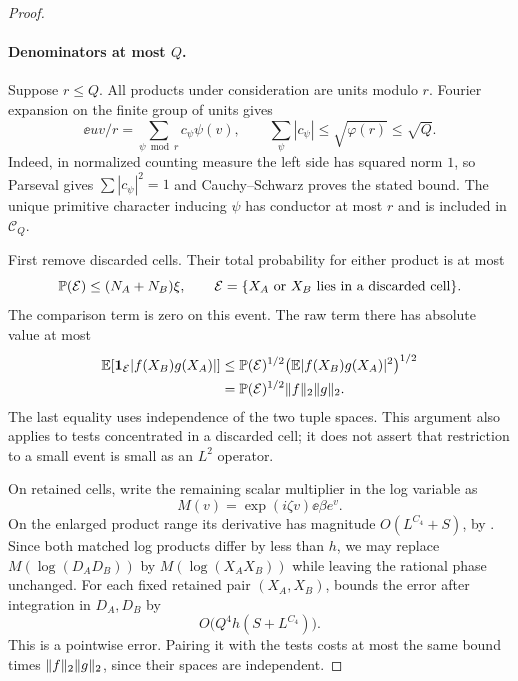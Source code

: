 \begin{proof}
\paragraph{Denominators at most $Q$.}
Suppose $r\leq Q$.  All products under consideration are units
modulo $r$.  Fourier expansion on the finite group of units gives
\begin{equation}\label{eq:ideal-rational-expansion}
 \ee{uv/r}=\sum_{\psi\bmod r}c_\psi\psi(v),\qquad
 \sum_\psi|c_\psi|\leq\sqrt{\varphi(r)}\leq\sqrt Q.
\end{equation}
Indeed, in normalized counting measure the left side has
squared norm $1$, so Parseval gives $\sum|c_\psi|^2=1$ and
Cauchy--Schwarz proves the stated bound.  The unique primitive
character inducing $\psi$ has conductor at most $r$ and is
included in $\mathcal C_Q$.

First remove discarded cells.  Their total probability for
either product is at most
\begin{equation}\label{eq:ideal-discarded-mass}
 \mathbb P(\mathcal E)\leq(N_A+N_B)\xi,
 \qquad
 \mathcal E=\{X_A\text{ or }X_B\text{ lies in a discarded cell}\}.
\end{equation}
The comparison term is zero on this event.  The raw term there
has absolute value at most
\begin{align*}
 \mathbb E[\mathbf 1_{\mathcal E}|f(X_B)g(X_A)|]
 &\leq\mathbb P(\mathcal E)^{1/2}
       \bigl(\mathbb E|f(X_B)g(X_A)|^2\bigr)^{1/2}\\
 &=\mathbb P(\mathcal E)^{1/2}\lVert f\rVert_2\lVert g\rVert_2.
\end{align*}
The last equality uses independence of the two tuple spaces.
This argument also applies to tests concentrated in a discarded
cell; it does not assert that restriction to a small event is
small as an $L^2$ operator.

On retained cells, write the remaining scalar multiplier in the
log variable as
\[
 M(v)=\exp(i\zeta v)\ee{\beta e^v}.
\]
On the enlarged product range its derivative has magnitude
$O(L^{C_4}+S)$, by .  Since both
matched log products differ by less than $h$, we may replace
$M(\log(D_AD_B))$ by $M(\log(X_AX_B))$ while leaving the
rational phase unchanged.  For each fixed retained pair
$(X_A,X_B)$,  bounds the error after
integration in $D_A,D_B$ by
\begin{equation}\label{eq:ideal-log-error}
 O\bigl(Q^4h(S+L^{C_4})\bigr).
\end{equation}
This is a pointwise error.  Pairing it with the tests costs at
most the same bound times $\lVert f\rVert_2\lVert g\rVert_2$, since their
spaces are independent.


\end{proof}
